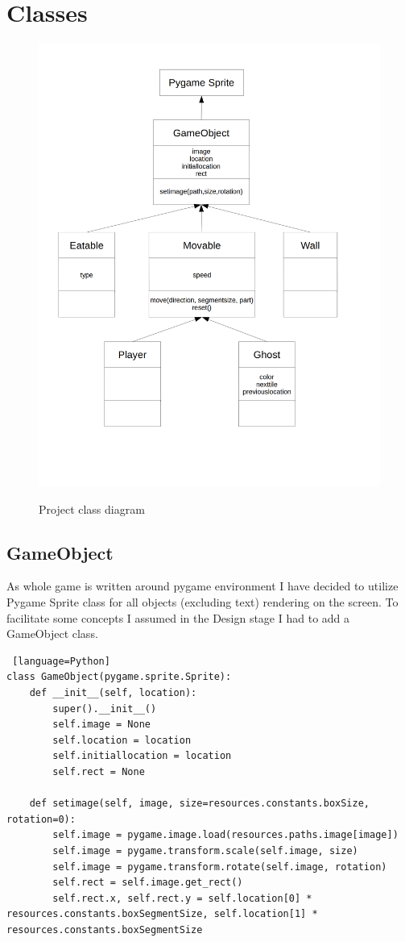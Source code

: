 \documentclass[11pt,a4paper]{report}
\newcommand{\dsubsection}[1]{\FloatBarrier \subsection{#1}}
\newenvironment{img}{
	\begin{center}
		\begin{figure}[H]
			\begin{center}
			
}{
	\end{center}
		\end{figure}
			\end{center}
}
\begin{document}
		\section{Classes}
			\begin{img}
				\includegraphics[width=400pt]{images/class_diagram}\\
				\caption{Project class diagram}
			\end{img}
			\dsubsection{GameObject}
				As whole game is written around pygame environment I have decided to utilize Pygame Sprite class for all objects (excluding text) rendering on the screen. To facilitate some concepts I assumed in the Design stage I had to add a GameObject class.\\
				\begin{lstlisting} [language=Python]
class GameObject(pygame.sprite.Sprite):
	def __init__(self, location):
		super().__init__()
		self.image = None
		self.location = location
		self.initiallocation = location
		self.rect = None

	def setimage(self, image, size=resources.constants.boxSize, rotation=0):
		self.image = pygame.image.load(resources.paths.image[image])
		self.image = pygame.transform.scale(self.image, size)
		self.image = pygame.transform.rotate(self.image, rotation)
		self.rect = self.image.get_rect()
		self.rect.x, self.rect.y = self.location[0] * resources.constants.boxSegmentSize, self.location[1] * resources.constants.boxSegmentSize
				\end{lstlisting}
				
\end{document}
